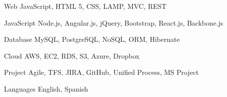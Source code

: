 


\begin{cvskills}



  \cvskill
    {Web} %
    {JavaScript, HTML 5, CSS, LAMP, MVC, REST} %


  \cvskill
    {JavaScript} %
    {Node.js, Angular.js, jQuery, Bootstrap, React.js, Backbone.js} %


  \cvskill
    {Database} %
    {MySQL, PostgreSQL, NoSQL, ORM, Hibernate} %


  \cvskill
    {Cloud} %
    {AWS, EC2, RDS, S3, Azure, Dropbox} %


  \cvskill
    {Project} %
    {Agile, TFS, JIRA, GitHub, Unified Process, MS Project} %





  \cvskill
    {Languages} %
    {English, Spanish} %



\end{cvskills}


